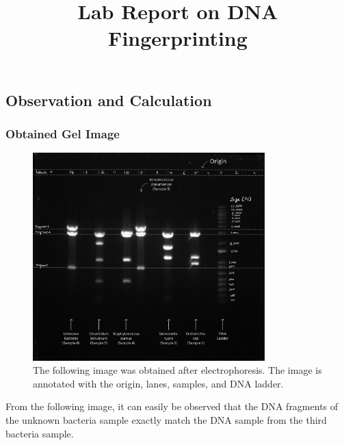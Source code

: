 \documentclass[pdflatex,sn-mathphys]{sn-jnl}%
\theoremstyle{thmstyleone}%
\theoremstyle{thmstyletwo}%
\theoremstyle{thmstylethree}%
\begin{document}
\title[DNA Fingerprinting Lab]{Lab Report on DNA Fingerprinting}

\author*[1]{ }



\maketitle

\subsection*{Observation and Calculation}
\subsubsection*{Obtained Gel Image}
\begin{figure}[hp]
\centering
\includegraphics[width=0.8\textwidth]{photos/gelimage-3.jpg}
\caption{The following image was obtained after electrophoresis. The image is annotated with the origin, lanes, samples, and DNA ladder.}\label{fig1}
\end{figure}
From the following image, it can easily be observed that the DNA fragments of the unknown bacteria sample exactly match the DNA sample from the third bacteria sample. \vspace{7pt}
\end{document}
